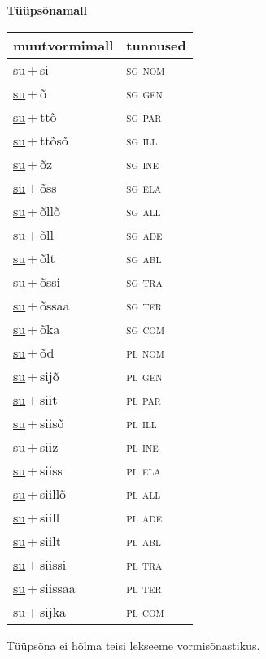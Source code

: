 
\vspace{1.8em}
\begin{minipage}{\textwidth}
\textbf{Tüüpsõnamall \,}\\

\begin{sideways}
\begin{tabular}{l l}
muutvormimall & tunnused \\
\hline
\underline{su}\,+\,si & \textsc{ sg nom } \\
\underline{su}\,+\,õ & \textsc{ sg gen } \\
\underline{su}\,+\,ttõ & \textsc{ sg par } \\
\underline{su}\,+\,ttõsõ & \textsc{ sg ill } \\
\underline{su}\,+\,õz & \textsc{ sg ine } \\
\underline{su}\,+\,õss & \textsc{ sg ela } \\
\underline{su}\,+\,õllõ & \textsc{ sg all } \\
\underline{su}\,+\,õll & \textsc{ sg ade } \\
\underline{su}\,+\,õlt & \textsc{ sg abl } \\
\underline{su}\,+\,õssi & \textsc{ sg tra } \\
\underline{su}\,+\,õssaa & \textsc{ sg ter } \\
\underline{su}\,+\,õka & \textsc{ sg com } \\
\underline{su}\,+\,õd & \textsc{ pl nom } \\
\underline{su}\,+\,sijõ & \textsc{ pl gen } \\
\underline{su}\,+\,siit & \textsc{ pl par } \\
\underline{su}\,+\,siisõ & \textsc{ pl ill } \\
\underline{su}\,+\,siiz & \textsc{ pl ine } \\
\underline{su}\,+\,siiss & \textsc{ pl ela } \\
\underline{su}\,+\,siillõ & \textsc{ pl all } \\
\underline{su}\,+\,siill & \textsc{ pl ade } \\
\underline{su}\,+\,siilt & \textsc{ pl abl } \\
\underline{su}\,+\,siissi & \textsc{ pl tra } \\
\underline{su}\,+\,siissaa & \textsc{ pl ter } \\
\underline{su}\,+\,sijka & \textsc{ pl com } \\
\end{tabular}
\end{sideways}
\label{tab:tüüpsõnamall-susi}

\end{minipage}

 
\vspace{1em}
\noindent Tüüpsõna ei hõlma teisi lekseeme vormi\-sõnastikus.
